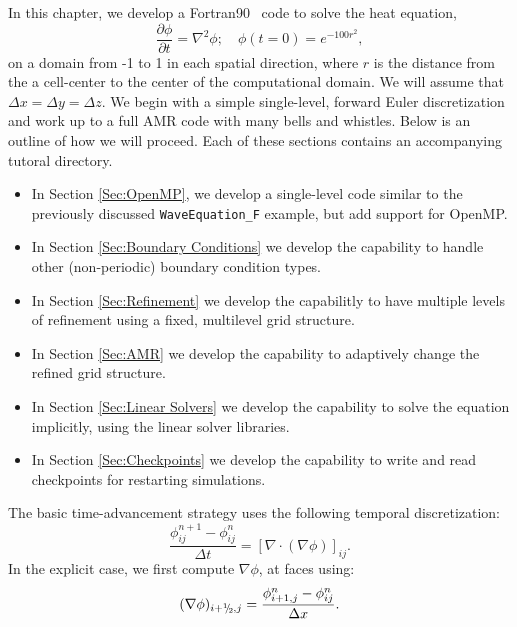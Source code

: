 In this chapter, we develop a Fortran90 \BoxLib\ code to solve the heat equation,
\begin{equation}
\frac{\partial\phi}{\partial t} = \nabla^2 \phi; \quad \phi(t=0) = e^{-100r^2},
\end{equation}
on a domain from -1 to 1 in each spatial direction, where $r$ is the distance
from the a cell-center to the center of the computational domain.  We will
assume that $\Delta x = \Delta y = \Delta z$.  We begin with a simple single-level, 
forward Euler discretization and work up to
a full AMR code with many bells and whistles.  Below is an outline of how we will 
proceed.  Each of these sections contains an accompanying tutoral directory.
\begin{itemize}

\item In Section \ref{Sec:OpenMP}, we develop a single-level code similar to the
previously discussed {\tt WaveEquation\_F} example, but add support for OpenMP.

\item In Section \ref{Sec:Boundary Conditions} we develop the capability to handle
other (non-periodic) boundary condition types.

\item In Section \ref{Sec:Refinement} we develop the capabilitly to have multiple
levels of refinement using a fixed, multilevel grid structure.

\item In Section \ref{Sec:AMR} we develop the capability to adaptively change the
refined grid structure.

\item In Section \ref{Sec:Linear Solvers} we develop the capability to solve the
equation implicitly, using the linear solver libraries.

\item In Section \ref{Sec:Checkpoints} we develop the capability to write and read
checkpoints for restarting simulations.

\end{itemize}
The basic time-advancement strategy uses the following temporal discretization:
\begin{equation}
\frac{\phi_{ij}^{n+1} - \phi_{ij}^n}{\Delta t} = \left[\nabla\cdot(\nabla\phi)\right]_{ij}.
\end{equation}
In the explicit case, we first compute $\nabla\phi$, at faces using:
\begin{equation}
(\nabla\phi)_{i+\myhalf,j} = \frac{\phi_{i+1,j}^n-\phi_{ij}^n}{\Delta x}.
\end{equation}
